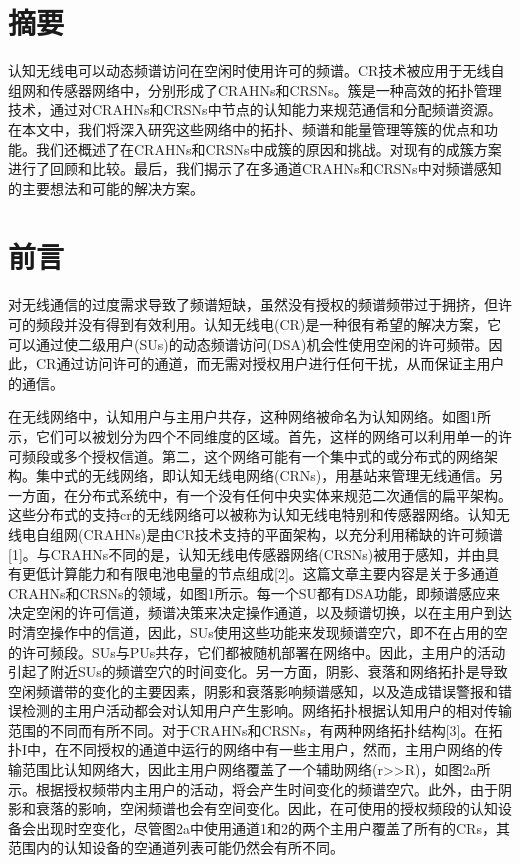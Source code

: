 \documentclass[a4paper,AutoFakeBold,oneside,12pt]{book}
\begin{document}
\songti{}
\chapter{摘要}
  认知无线电可以动态频谱访问在空闲时使用许可的频谱。CR技术被应用于无线自组网和传感器网络中，分别形成了CRAHNs和CRSNs。簇是一种高效的拓扑管理技术，通过对CRAHNs和CRSNs中节点的认知能力来规范通信和分配频谱资源。在本文中，我们将深入研究这些网络中的拓扑、频谱和能量管理等簇的优点和功能。我们还概述了在CRAHNs和CRSNs中成簇的原因和挑战。对现有的成簇方案进行了回顾和比较。最后，我们揭示了在多通道CRAHNs和CRSNs中对频谱感知的主要想法和可能的解决方案。
\chapter{前言}
  对无线通信的过度需求导致了频谱短缺，虽然没有授权的频谱频带过于拥挤，但许可的频段并没有得到有效利用。认知无线电(CR)是一种很有希望的解决方案，它可以通过使二级用户(SUs)的动态频谱访问(DSA)机会性使用空闲的许可频带。因此，CR通过访问许可的通道，而无需对授权用户进行任何干扰，从而保证主用户的通信。
  
  在无线网络中，认知用户与主用户共存，这种网络被命名为认知网络。如图1所示，它们可以被划分为四个不同维度的区域。首先，这样的网络可以利用单一的许可频段或多个授权信道。第二，这个网络可能有一个集中式的或分布式的网络架构。集中式的无线网络，即认知无线电网络(CRNs)，用基站来管理无线通信。另一方面，在分布式系统中，有一个没有任何中央实体来规范二次通信的扁平架构。这些分布式的支持cr的无线网络可以被称为认知无线电特别和传感器网络。认知无线电自组网(CRAHNs)是由CR技术支持的平面架构，以充分利用稀缺的许可频谱[1]。与CRAHNs不同的是，认知无线电传感器网络(CRSNs)被用于感知，并由具有更低计算能力和有限电池电量的节点组成[2]。这篇文章主要内容是关于多通道CRAHNs和CRSNs的领域，如图1所示。每一个SU都有DSA功能，即频谱感应来决定空闲的许可信道，频谱决策来决定操作通道，以及频谱切换，以在主用户到达时清空操作中的信道，因此，SUs使用这些功能来发现频谱空穴，即不在占用的空的许可频段。SUs与PUs共存，它们都被随机部署在网络中。因此，主用户的活动引起了附近SUs的频谱空穴的时间变化。另一方面，阴影、衰落和网络拓扑是导致空闲频谱带的变化的主要因素，阴影和衰落影响频谱感知，以及造成错误警报和错误检测的主用户活动都会对认知用户产生影响。网络拓扑根据认知用户的相对传输范围的不同而有所不同。对于CRAHNs和CRSNs，有两种网络拓扑结构[3]。在拓扑I中，在不同授权的通道中运行的网络中有一些主用户，然而，主用户网络的传输范围比认知网络大，因此主用户网络覆盖了一个辅助网络(r>>R)，如图2a所示。根据授权频带内主用户的活动，将会产生时间变化的频谱空穴。此外，由于阴影和衰落的影响，空闲频谱也会有空间变化。因此，在可使用的授权频段的认知设备会出现时空变化，尽管图2a中使用通道1和2的两个主用户覆盖了所有的CRs，其范围内的认知设备的空通道列表可能仍然会有所不同。
  
\end{document}
